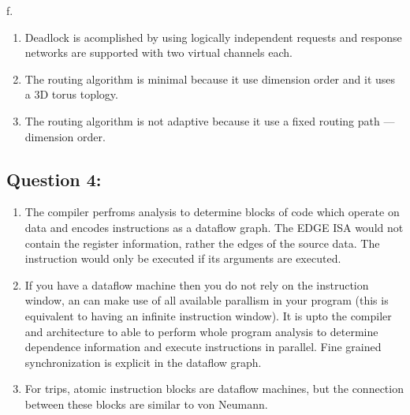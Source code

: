 f.

\begin{enumerate}
\def\labelenumi{\arabic{enumi}.}
\item
  Deadlock is acomplished by using logically independent requests and
  response networks are supported with two virtual channels each.
\item
  The routing algorithm is minimal because it use dimension order and it
  uses a 3D torus toplogy.
\item
  The routing algorithm is not adaptive because it use a fixed routing
  path --- dimension order.
\end{enumerate}

\subsection{Question 4:}

\begin{enumerate}
\def\labelenumi{\alph{enumi}.}
\item
  The compiler perfroms analysis to determine blocks of code which
  operate on data and encodes instructions as a dataflow graph. The EDGE
  ISA would not contain the register information, rather the edges of
  the source data. The instruction would only be executed if its
  arguments are executed.
\item
  If you have a dataflow machine then you do not rely on the instruction
  window, an can make use of all available parallism in your program
  (this is equivalent to having an infinite instruction window). It is
  upto the compiler and architecture to able to perform whole program
  analysis to determine dependence information and execute instructions
  in parallel. Fine grained synchronization is explicit in the dataflow
  graph.
\item
  For trips, atomic instruction blocks are dataflow machines, but the
  connection between these blocks are similar to von Neumann.
\end{enumerate}
